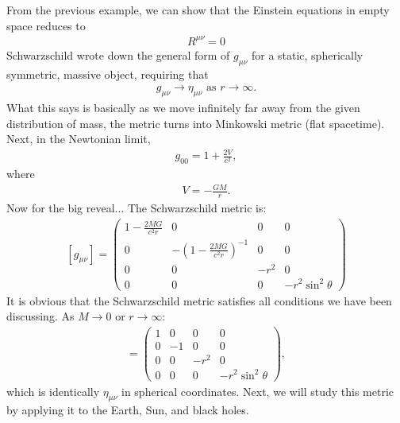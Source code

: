 \documentclass{book}
\theoremstyle{definition}
\begin{document}
From the previous example, we can show that the Einstein equations in empty space reduces to
\begin{align*}
\boxed{R^{\mu\nu} = 0}
\end{align*}
Schwarzschild wrote down the general form of $g_{\mu\nu}$ for a static, spherically symmetric, massive object, requiring that
\begin{align*}
g_{\mu\nu} \rightarrow \eta_{\mu\nu} \text{ as } r \rightarrow \infty.
\end{align*} 
What this says is basically as we move infinitely far away from the given distribution of mass, the metric turns into Minkowski metric (flat spacetime). Next, in the Newtonian limit, 
\begin{align*}
g_{00} = 1 + \frac{2V}{c^2},
\end{align*}
where 
\begin{align*}
V = -\frac{GM}{r}.
\end{align*}
Now for the big reveal... The Schwarzschild metric is:
\begin{align*}
\boxed{[g_{\mu\nu}]
=
\begin{pmatrix}
1 - \frac{2MG}{c^2r} & 0 & 0 & 0\\
0 & -\left(1 - \frac{2MG}{c^2r} \right) ^{-1} & 0 & 0\\
0 & 0 & -r^2 & 0\\
0 & 0 & 0 & -r^2\sin^2\theta
\end{pmatrix}
}
\end{align*}
It is obvious that the Schwarzschild metric satisfies all conditions we have been discussing. As $M\rightarrow 0$ or $r \rightarrow \infty $:
\begin{align*}
[g_{\mu\nu}]  =
\begin{pmatrix}
1 & 0 & 0 & 0\\
0 & -1 & 0 & 0\\
0 & 0 & -r^2 & 0\\
0 & 0 & 0 & -r^2\sin^2\theta
\end{pmatrix},
\end{align*}
which is identically $\eta_{\mu\nu}$ in spherical coordinates. Next, we will study this metric by applying it to the Earth, Sun, and black holes. \\
\end{document}
